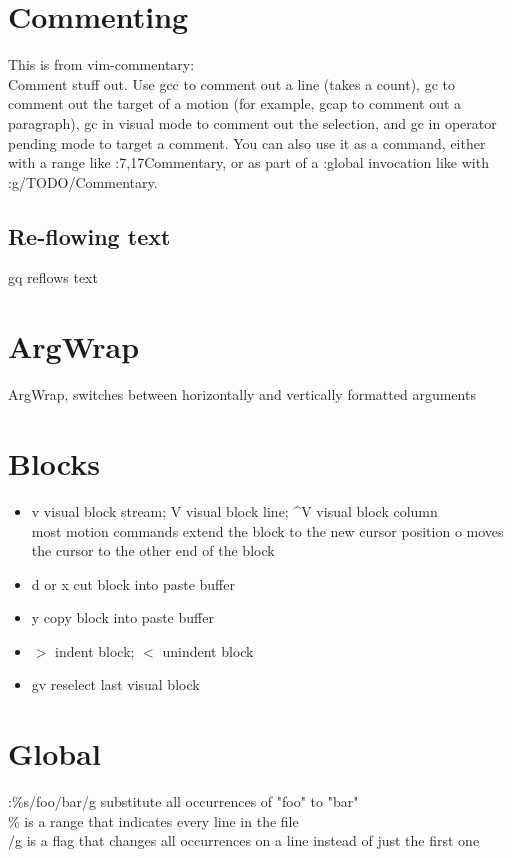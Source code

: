\documentclass{article}
\begin{document}
\section{Commenting}
This is from vim-commentary:\\
Comment stuff out. Use gcc to comment out a line (takes a count), gc to comment
out the target of a motion (for example, gcap to comment out a paragraph), gc in
visual mode to comment out the selection, and gc in operator pending mode to
target a comment. You can also use it as a command, either with a range like
:7,17Commentary, or as part of a :global invocation like with
:g/TODO/Commentary. \\
\subsection{Re-flowing text}
gq reflows text

\section{ArgWrap}
ArgWrap, switches between horizontally and vertically formatted arguments

\section{Blocks}
\begin{itemize}
    \item v visual block stream; V visual block line; \textasciicircum V visual block column\\
        most motion commands extend the block to the new cursor position
        o moves the cursor to the other end of the block
    \item d or x cut block into paste buffer
    \item y copy block into paste buffer
    \item $>$ indent block; $<$ unindent block
    \item gv reselect last visual block
    \end{itemize}

\section{Global}

     :\%s/foo/bar/g substitute all occurrences of "foo" to "bar"\\
        \% is a range that indicates every line in the file\\
        /g is a flag that changes all occurrences on a line instead of just the first one
\end{document}
